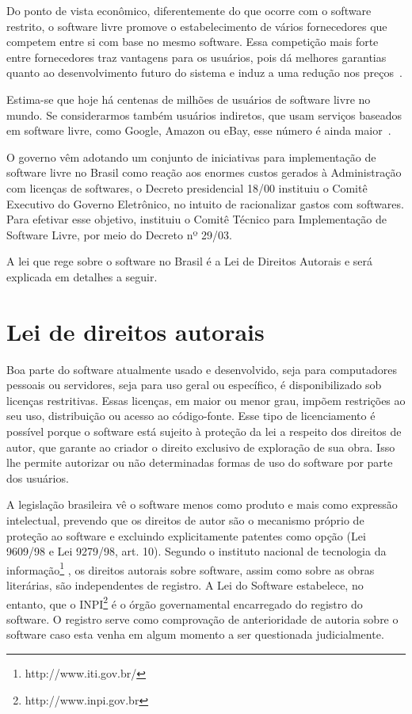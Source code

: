 Do ponto de vista econômico, diferentemente do que ocorre com o software 
restrito, o software livre promove o estabelecimento
de vários fornecedores que competem entre si com base no mesmo software. Essa competição 
mais forte entre fornecedores traz vantagens para os usuários, pois dá melhores
garantias quanto ao desenvolvimento futuro do sistema e induz a uma redução nos 
preços~\cite{kon2012software}.

Estima-se que hoje há centenas de milhões de usuários de software livre no mundo. Se
considerarmos também usuários indiretos, que usam serviços baseados em software livre,
como Google, Amazon ou eBay, esse número é ainda maior~\cite{sabino2009licenccas}.

O governo vêm adotando um conjunto de iniciativas para implementação de software
livre no Brasil como reação aos enormes custos gerados à Administração com licenças
de softwares, o Decreto presidencial 18/00 instituiu o Comitê Executivo do Governo
Eletrônico, no intuito de racionalizar gastos com softwares. Para efetivar esse 
objetivo, instituiu o Comitê Técnico para Implementação de Software Livre, por
meio do Decreto nº 29/03. 

A lei que rege sobre o software no Brasil é a Lei de Direitos Autorais e será 
explicada em detalhes a seguir. 


\section{Lei de direitos autorais}

Boa parte do software atualmente usado e desenvolvido, seja para computadores 
pessoais ou servidores, seja para uso geral ou específico, é disponibilizado sob
licenças restritivas. Essas licenças, em maior ou menor grau, impõem restrições 
ao seu uso, distribuição ou acesso ao código-fonte. Esse tipo de licenciamento é 
possível porque o software está sujeito à proteção da lei a respeito dos direitos 
de autor, que garante ao criador o direito exclusivo de exploração de sua obra. 
Isso lhe permite autorizar ou não determinadas formas de uso do software por parte 
dos usuários.%

A legislação brasileira vê o software menos como produto e mais como expressão 
intelectual, prevendo que os direitos de autor são o mecanismo próprio de proteção 
ao software e excluindo explicitamente patentes como opção (Lei 9609/98 e Lei 9279/98, art. 10).
%
Segundo o instituto nacional de tecnologia da informação\footnote{http://www.iti.gov.br/}
, os direitos autorais sobre software, assim como sobre as obras literárias, são 
independentes de registro. A Lei do Software estabelece, no entanto, que o INPI\footnote{http://www.inpi.gov.br}
é o órgão governamental encarregado do registro do software. O registro serve 
como comprovação de anterioridade de autoria sobre o software caso esta venha 
em algum momento a ser questionada judicialmente.

